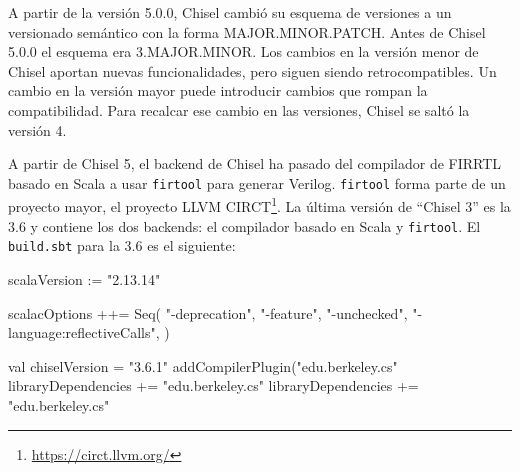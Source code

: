 \documentclass[%
    10pt,
    headinclude, footinclude=false,
    openright, %
    notitlepage,
    cleardoublepage=empty,
    headsepline,
    numbers=noenddot,
    bibliography=totoc, index=totoc,
    ]{scrbook}
\newcommand{\code}[1]{{\lstinline[basicstyle=\small\ttfamily]{#1}}}
\newcommand{\myref}[2]{\href{#1}{#2}}
\renewcommand{\myref}[2]{{#2}{\footnote{\url{#1}}}}
\begin{document}


A partir de la versión 5.0.0, Chisel cambió su esquema de versiones a un versionado semántico con la
forma MAJOR.MINOR.PATCH. Antes de Chisel 5.0.0 el esquema era 3.MAJOR.MINOR.
Los cambios en la versión menor de Chisel aportan nuevas funcionalidades, pero siguen siendo retrocompatibles.
Un cambio en la versión mayor puede introducir cambios que rompan la compatibilidad.
Para recalcar ese cambio en las versiones, Chisel se saltó la versión 4.


A partir de Chisel 5, el backend de Chisel ha pasado del compilador de FIRRTL basado en Scala a usar
\code{firtool} para generar Verilog. \code{firtool} forma parte de un proyecto mayor,
el proyecto \myref{https://circt.llvm.org/}{LLVM CIRCT}.
La última versión de ``Chisel 3'' es la 3.6 y contiene los dos backends: el compilador basado en
Scala y \code{firtool}.
El \code{build.sbt} para la 3.6 es el siguiente:

\begin{chisel}
scalaVersion := "2.13.14"

scalacOptions ++= Seq(
  "-deprecation",
  "-feature",
  "-unchecked",
  "-language:reflectiveCalls",
)

val chiselVersion = "3.6.1"
addCompilerPlugin("edu.berkeley.cs" %
libraryDependencies += "edu.berkeley.cs" %
libraryDependencies += "edu.berkeley.cs" %
\end{chisel}

\end{document}
